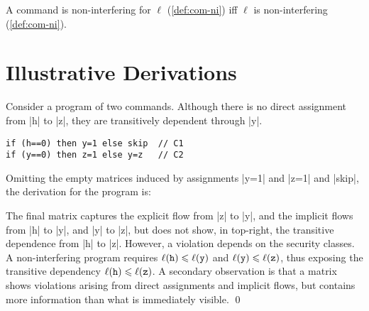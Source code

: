 \begin{conjecture}[Correspondence]
A command %
is non-interfering for \(\ell\) (\autoref{def:com-ni})
iff \(\ell\) is non-interfering (\autoref{def:com-ni}).
\end{conjecture}


\tocless\section{Illustrative Derivations}
\label{sec:examples}

\begin{example}
Consider a program of two commands.
Although there is no direct assignment from \prc|h| to \prc|z|, they are transitively dependent through \prc|y|.

\begin{lstlisting}[style=C]
if (h==0) then y=1 else skip  // C1
if (y==0) then z=1 else y=z   // C2
\end{lstlisting}
Omitting the empty matrices induced by assignments \prc|y=1| and \prc|z=1| and \prc|skip|, the derivation for the program is:
\begin{center}\end{center}
The final matrix captures the explicit flow from \prc|z| to \prc|y|,
and the implicit flows from \prc|h| to \prc|y|, and \prc|y| to \prc|z|,
but does not show, in top-right, the transitive dependence from \prc|h| to \prc|z|.
However, a violation depends on the security classes.
A non-interfering program requires \(\ell(\mathtt{h}) \leqslant \ell(\mathtt{y})\) and \(\ell(\mathtt{y}) \leqslant \ell(\mathtt{z})\),
thus exposing the transitive dependency $\ell(\mathtt{h}) \leqslant \ell(\mathtt{z})$.
A secondary observation is that a matrix shows violations arising from direct assignments and implicit flows,
but contains more information than what is immediately visible.
\qed
\end{example}


